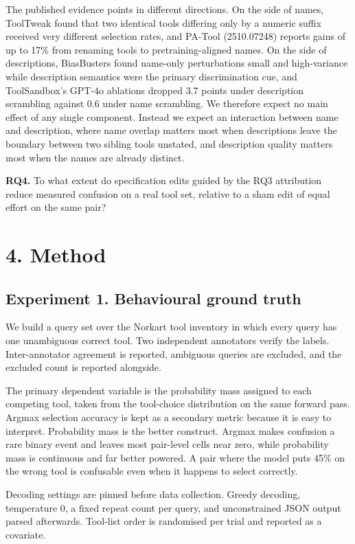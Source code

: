 \documentclass[11pt,a4paper]{article}
\begin{document}
The published evidence points in different directions. On the side of names, ToolTweak found that
two identical tools differing only by a numeric suffix received very different selection rates,
and PA-Tool (2510.07248) reports gains of up to 17\% from renaming tools to pretraining-aligned
names. On the side of descriptions, BiasBusters found name-only perturbations small and
high-variance while description semantics were the primary discrimination cue, and ToolSandbox's
GPT-4o ablations dropped 3.7 points under description scrambling against 0.6 under name
scrambling. We therefore expect no main effect of any single component. Instead we expect an
interaction between name and description, where name overlap matters most when descriptions leave
the boundary between two sibling tools unstated, and description quality matters most when the
names are already distinct.

\textbf{RQ4.} To what extent do specification edits guided by the RQ3 attribution reduce measured
confusion on a real tool set, relative to a sham edit of equal effort on the same pair?

\section*{4. Method}

\subsection*{Experiment 1. Behavioural ground truth}

We build a query set over the Norkart tool inventory in which every query has one unambiguous
correct tool. Two independent annotators verify the labels. Inter-annotator agreement is
reported, ambiguous queries are excluded, and the excluded count is reported alongside.

The primary dependent variable is the probability mass assigned to each competing tool, taken
from the tool-choice distribution on the same forward pass. Argmax selection accuracy is kept as
a secondary metric because it is easy to interpret. Probability mass is the better construct.
Argmax makes confusion a rare binary event and leaves most pair-level cells near zero, while
probability mass is continuous and far better powered. A pair where the model puts 45\% on the
wrong tool is confusable even when it happens to select correctly.

Decoding settings are pinned before data collection. Greedy decoding, temperature 0, a fixed
repeat count per query, and unconstrained JSON output parsed afterwards. Tool-list order is
randomised per trial and reported as a covariate.
\end{document}
